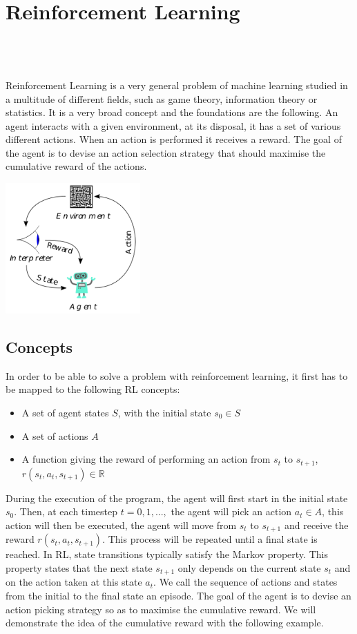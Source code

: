 
\setcounter{chapter}{1}

\chapter{Reinforcement Learning}
\mbox{}\\
\mbox{}\\
\mbox{}\\
Reinforcement Learning\cite{kaelbling1996reinforcement} is a very general problem of machine learning studied in a multitude of different fields, such as game theory, information theory or statistics. It is a very broad concept and the foundations are the following. An agent interacts with a given environment, at its disposal, it has a set of various different actions. When an action is performed it receives a reward. The goal of the agent is to devise an action selection strategy that should maximise the cumulative reward of the actions.

\begin{center}
	\includegraphics*[height=5cm]{figures/rl_broad.png}
\end{center}

\section{Concepts}
In order to be able to solve a problem with reinforcement learning, it first has to be mapped to the following RL concepts:
\begin{itemize}
	\item A set of agent states $S$, with the initial state $s_0\in S$
	\item A set of actions $A$
	\item A function giving the reward of performing an action from  $s_t$ to $s_{t+1}$, $r(s_t,a_t,s_{t+1})\in \mathbb{R}$
\end{itemize}
During the execution of the program, the agent will first start in the initial state $s_0$. Then, at each timestep $t=0,1,...,$ the agent will pick an action $a_t \in A$, this action will then be executed, the agent will move from $s_t$ to $s_{t+1}$ and receive the reward $r(s_t,a_t,s_{t+1})$. This process will be repeated until a final state is reached. In RL, state transitions typically satisfy the Markov property. This property states that the next state $s_{t+1}$ only depends on the current state $s_t$ and on the action taken at this state $a_t$. We call the sequence of actions and states from the initial to the final state an episode. The goal of the agent is to devise an action picking strategy so as to maximise the cumulative reward. We will demonstrate the idea of the cumulative reward with the following example.
